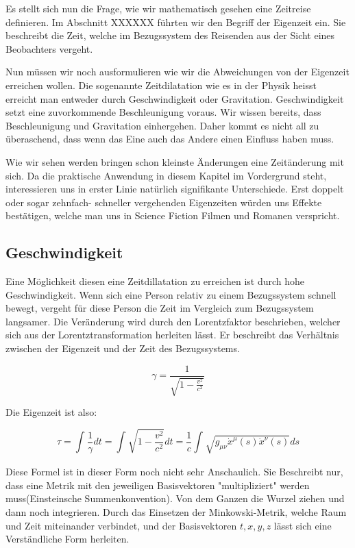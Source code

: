 \begin{refsection}
Es stellt sich nun die Frage, wie wir mathematisch gesehen eine Zeitreise definieren. Im Abschnitt XXXXXX führten wir den Begriff der Eigenzeit ein. Sie beschreibt die Zeit, welche im Bezugssystem des Reisenden aus der Sicht eines Beobachters vergeht.

Nun müssen wir noch ausformulieren wie wir die Abweichungen von der Eigenzeit erreichen wollen. Die sogenannte Zeitdilatation wie es in der Physik heisst erreicht man entweder durch Geschwindigkeit oder Gravitation. Geschwindigkeit setzt eine zuvorkommende Beschleunigung voraus. Wir wissen bereits, dass Beschleunigung und Gravitation einhergehen. Daher kommt es nicht all zu \"uberaschend, dass wenn das Eine auch das Andere einen Einfluss haben muss.

Wie wir sehen werden bringen schon kleinste \"Anderungen eine Zeitänderung mit sich. Da die praktische Anwendung in diesem Kapitel im Vordergrund steht, interessieren uns in erster Linie natürlich signifikante Unterschiede. Erst doppelt oder sogar zehnfach- schneller vergehenden Eigenzeiten w\"urden uns Effekte best\"atigen, welche man uns in Science Fiction Filmen und Romanen verspricht.

\subsection{Geschwindigkeit}

Eine M\"oglichkeit diesen eine Zeitdillatation zu erreichen ist durch hohe Geschwindigkeit. Wenn sich eine Person relativ zu einem Bezugssystem schnell bewegt, vergeht f\"ur diese Person die Zeit im Vergleich zum Bezugssystem langsamer. Die Ver\"anderung wird durch den Lorentzfaktor beschrieben, welcher sich aus der Lorentztransformation herleiten l\"asst. Er beschreibt das Verh\"altnis zwischen der Eigenzeit und der Zeit des Bezugssystems.

\begin{equation}
    \gamma=\frac{1}{\sqrt{1-\frac{v^2}{c^2}}} 
\end{equation}



Die Eigenzeit ist also:

\begin{equation}
    \tau
    =
    \int_{}^{}\frac{1}{\gamma}dt=\int_{}^{}\sqrt{1-\frac{v^2}{c^2}}dt
    =
    \frac{1}{c}\int_{}^{}\sqrt{g_{\mu\nu}\dot{x}^{\mu}(s)\dot{x}^{\nu}(s)}ds
\end{equation}

Diese Formel ist in dieser Form noch nicht sehr Anschaulich. Sie Beschreibt nur, dass eine Metrik mit den jeweiligen Basisvektoren "multipliziert" werden muss(Einsteinsche Summenkonvention). Von dem Ganzen die Wurzel ziehen und dann noch integrieren.
Durch das Einsetzen der Minkowski-Metrik, welche Raum und Zeit miteinander verbindet, und der Basisvektoren $t, x, y, z$ l\"asst sich eine Verst\"andliche Form herleiten. 


\end{refsection}
